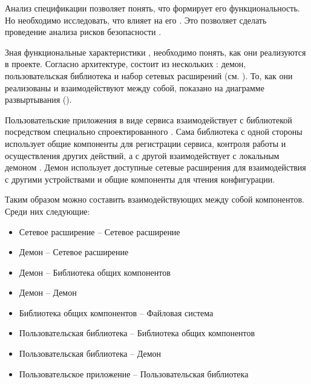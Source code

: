 %
Анализ спецификации  позволяет понять, что формирует его функциональность. 
%
Но необходимо исследовать, что влияет на его . 
%
Это позволяет сделать проведение анализа рисков безопасности . 

%
Зная функциональные характеристики , необходимо понять, как они реализуются в проекте. 
%
Согласно архитектуре,  состоит из нескольких : демон, пользовательская библиотека и набор сетевых расширений (см. ).
%
То, как они реализованы и взаимодействуют между собой, показано на диаграмме развыртывания  (). 


%
Пользовательские приложения в виде сервиса взаимодействует с библиотекой  посредством специально спроектированного .
%
Сама библиотека с одной стороны использует общие компоненты для регистрации сервиса, контроля работы  и осуществления других действий, а с другой взаимодействует с локальным демоном .
%
Демон  использует доступные сетевые расширения для взаимодействия с другими устройствами и общие компоненты для чтения конфигурации. 

%
Таким образом можно составить  взаимодействующих между собой компонентов.
%
Среди них следующие:
\begin{itemize}
	\setlength{\itemsep}{0pt}%

	\item Сетевое расширение -- Сетевое расширение
	\item Демон -- Сетевое расширение
	\item Демон -- Библиотека общих компонентов
	\item Демон -- Демон
	\item Библиотека общих компонентов -- Файловая система
	\item Пользовательская библиотека -- Библиотека общих компонентов
	\item Пользовательская библиотека -- Демон
	\item Пользовательское приложение -- Пользовательская библиотека
\end{itemize}

